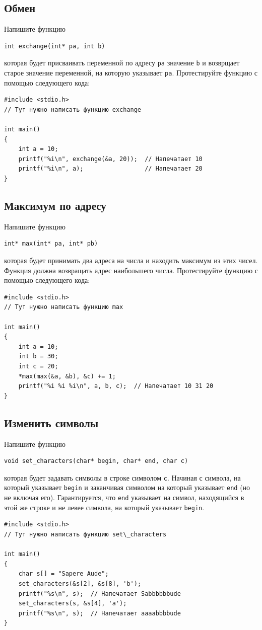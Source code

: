 \documentclass[10pt]{article}
\begin{document}
\subsection{Обмен}
Напишите функцию
\begin{lstlisting}
int exchange(int* pa, int b)
\end{lstlisting}
которая будет присваивать переменной по адресу \texttt{pa} значение \texttt{b} и возврщает старое значение переменной, на которую указывает \texttt{pa}. Протестируйте функцию с помощью следующего кода:
\begin{lstlisting}
#include <stdio.h>
// Тут нужно написать функцию exchange

int main() 
{
    int a = 10;
    printf("%i\n", exchange(&a, 20));  // Напечатает 10
    printf("%i\n", a);                 // Напечатает 20
}
\end{lstlisting} 

\subsection{Максимум по адресу}
Напишите функцию
\begin{lstlisting}
int* max(int* pa, int* pb)
\end{lstlisting}
которая будет принимать два адреса на числа и находить максимум из этих чисел.
Функция должна возвращать адрес наибольшего числа. Протестируйте функцию с помощью следующего кода:
\begin{lstlisting}
#include <stdio.h>
// Тут нужно написать функцию max

int main() 
{
    int a = 10;
    int b = 30;
    int c = 20;
    *max(max(&a, &b), &c) += 1;
    printf("%i %i %i\n", a, b, c);  // Напечатает 10 31 20
}
\end{lstlisting} 

\subsection{Изменить символы}
Напишите функцию
\begin{lstlisting}
void set_characters(char* begin, char* end, char c)
\end{lstlisting}
которая будет задавать символы в строке символом \texttt{c}. Начиная с символа, на который указывает \texttt{begin} и заканчивая символом на который указывает \texttt{end} (но не включая его). Гарантируется, что \texttt{end} указывает на символ, находящийся в этой же строке и не левее символа, на который указывает \texttt{begin}.
\begin{lstlisting}
#include <stdio.h>
// Тут нужно написать функцию set\_characters

int main() 
{
    char s[] = "Sapere Aude";
    set_characters(&s[2], &s[8], 'b');
    printf("%s\n", s);  // Напечатает Sabbbbbbude
    set_characters(s, &s[4], 'a');
    printf("%s\n", s);  // Напечатает aaaabbbbude
}
\end{lstlisting}
\end{document}
